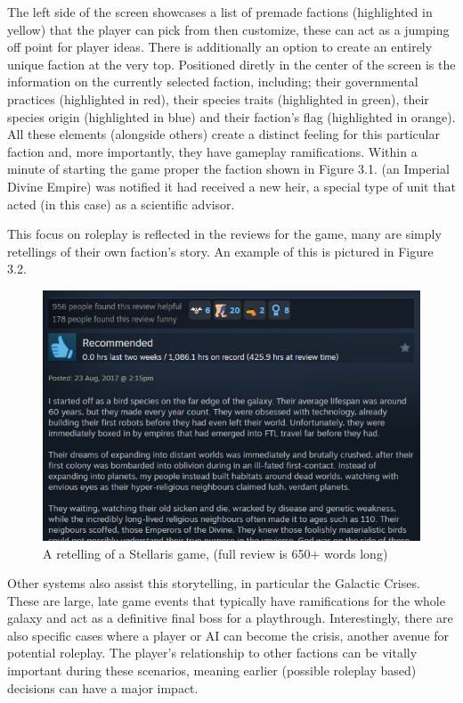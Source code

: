 \documentclass{report}
\begin{document}
The left side of the screen showcases a list of premade factions (highlighted in yellow) that the player can pick from then customize, these can act as a  jumping off point for player ideas. There is additionally an option to create an entirely unique faction at the very top. 
Positioned diretly in the center of the screen is the information on the currently selected faction, including; their governmental practices (highlighted in red), their species traits (highlighted in green), their species origin (highlighted in blue) and their faction's flag (highlighted in orange). All these elements (alongside others) create a distinct feeling for this particular faction and, more importantly, they have gameplay ramifications. Within a minute of starting the game proper the faction shown in Figure 3.1. (an Imperial Divine Empire) was notified it had received a new heir, a special type of unit that acted (in this case) as a scientific advisor.

This focus on roleplay is reflected in the reviews for the game, many are simply retellings of their own faction's story. An example of this is pictured in Figure 3.2.

\begin{figure}[H]
    \includegraphics[width=\textwidth]{stellaris_positive_review.png}
    \caption{A retelling of a Stellaris game, (full review is 650+ words long)}
\end{figure}

Other systems also assist this storytelling, in particular the Galactic Crises. These are large, late game events that typically have ramifications for the whole galaxy and act as a definitive final boss for a playthrough. Interestingly, there are also specific cases where a player or AI can become the crisis, another avenue for potential roleplay. The player's relationship to other factions can be vitally important during these scenarios, meaning earlier (possible roleplay based) decisions can have a major impact.
\end{document}
